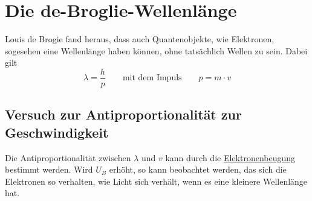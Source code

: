\documentclass{article}
\begin{document}
\section{Die de-Broglie-Wellenlänge}
Louis de Brogie fand heraus, dass auch Quantenobjekte, wie Elektronen, sogesehen eine Wellenlänge haben können, ohne tatsächlich Wellen zu sein.
Dabei gilt
\[
 \lambda = \frac{h}{p} 
 \qquad
 \text{mit dem Impuls}
 \qquad
 p = m \cdot v 
\]
 
\subsection{Versuch zur Antiproportionalität zur Geschwindigkeit}
Die Antiproportionalität zwischen $\lambda$ und $v$ kann durch die \hyperref[Elektronenbeugung]{Elektronenbeugung} bestimmt werden. Wird $U_B$ erhöht, so kann beobachtet werden, das sich die Elektronen so verhalten, wie Licht sich verhält, wenn es eine kleinere Wellenlänge hat.
 
\end{document}
